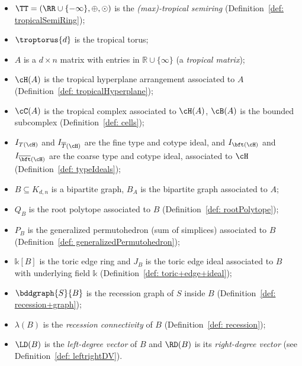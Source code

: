 \begin{itemize}
\item $\TT = (\RR\cup \{-\infty\},\oplus, \odot)$ is the \emph{(max)-tropical semiring} (Definition~\ref{def: tropicalSemiRing});

\item $\troptorus{d}$ is the tropical torus;

\item $A$ is a $d \times n$ matrix with entries in ${\mathbb R} \cup \{ \infty \}$ (a \textit{tropical matrix});

\item
$\cH(A)$ is the tropical hyperplane arrangement associated to $A$ (Definition~\ref{def: tropicalHyperplane});

\item
$\cC(A)$ is the tropical complex associated to $\cH(A)$, $\cB(A)$ is the bounded subcomplex (Definition~\ref{def: cells});

\item
$I_{T(\cH)}$ and $I_{\overline{T}(\cH)}$ are the fine type and cotype ideal, and $I_{\bft(\cH)}$ and  $I_{\overline{\bft}(\cH)}$ are the coarse type and cotype ideal, associated to $\cH$ (Definition~\ref{def: typeIdeals});

\item $B \subseteq K_{d,n}$ is a bipartite graph, $B_A$ is the bipartite graph associated to $A$;

\item
$Q_B$ is the root polytope associated to $B$ (Definition~\ref{def: rootPolytope});


\item
$P_B$ is the generalized permutohedron (sum of simplices) associated to $B$ (Definition~\ref{def: generalizedPermutohedron});

\item
${\mathbb k}[B]$ is the toric edge ring and $J_B$ is the toric edge ideal associated to $B$ with underlying field ${\mathbb k}$ (Definition~\ref{def: toric+edge+ideal});

\item
$\bddgraph{S}{B}$ is the recession graph of $S$ inside $B$ (Definition~\ref{def: recession+graph});
    
\item $\lambda(B)$ is the \textit{recession connectivity} of $B$ (Definition~\ref{def: recession}); 

\item $\LD(B)$ is the \textit{left-degree vector} of $B$ and $\RD(B)$ is its \textit{right-degree vector} (see Definition~\ref{def: leftrightDV}).
\end{itemize}

